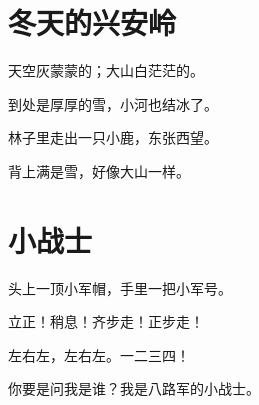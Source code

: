 \documentclass[12pt,UTF-8,openany]{ctexbook}
\begin{document}
\chapter{冬天的兴安岭}

\begin{large}
    
    天空灰蒙蒙的；大山白茫茫的。
    
    到处是厚厚的雪，小河也结冰了。
    
    林子里走出一只小鹿，东张西望。
    
    背上满是雪，好像大山一样。
    
\end{large}


\clearpage

\begin{center}
    
\end{center}


\hanzibox{}\hanzibox{}\hanzibox{}\hanzibox{}\hspace{1em}\hanzibox{}\hanzibox{}\hanzibox{}\hanzibox{}

\hanzibox{}\hanzibox{}\hanzibox{}\hanzibox{}\hspace{1em}\hanzibox{}\hanzibox{}\hanzibox{}\hanzibox{}

\hanzibox{}\hanzibox{}\hanzibox{}\hanzibox{}\hspace{1em}\hanzibox{}\hanzibox{}\hanzibox{}\hanzibox{}

\hanzibox{}\hanzibox{}\hanzibox{}\hanzibox{}\hspace{1em}




\chapter{小战士}

\begin{large}
    
    头上一顶小军帽，手里一把小军号。
    
    立正！稍息！齐步走！正步走！
    
    左右左，左右左。一二三四！
    
    你要是问我是谁？我是八路军的小战士。
    
\end{large}
\end{document}
